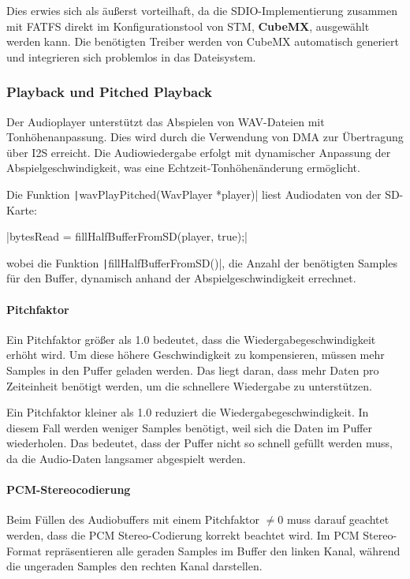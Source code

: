 Dies erwies sich als äußerst vorteilhaft, da die SDIO-Implementierung zusammen mit FATFS direkt im Konfigurationstool von STM, \textbf{CubeMX}, ausgewählt werden kann. Die benötigten Treiber werden von CubeMX automatisch generiert und integrieren sich problemlos in das Dateisystem.

\subsubsection{Playback und Pitched Playback}

Der Audioplayer unterstützt das Abspielen von WAV-Dateien mit Tonhöhenanpassung. Dies wird durch die Verwendung von DMA zur Übertragung über I2S erreicht. Die Audiowiedergabe erfolgt mit dynamischer Anpassung der Abspielgeschwindigkeit, was eine Echtzeit-Tonhöhenänderung ermöglicht.

Die Funktion \texttt|wavPlayPitched(WavPlayer *player)| liest Audiodaten von der SD-Karte:

|bytesRead = fillHalfBufferFromSD(player, true);|

wobei die Funktion \texttt|fillHalfBufferFromSD()|, die Anzahl der benötigten Samples für den Buffer, dynamisch anhand der Abspielgeschwindigkeit errechnet.

\paragraph{Pitchfaktor}

Ein Pitchfaktor größer als 1.0 bedeutet, dass die Wiedergabegeschwindigkeit erhöht wird. Um diese höhere Geschwindigkeit zu kompensieren, müssen mehr Samples in den Puffer geladen werden. Das liegt daran, dass mehr Daten pro Zeiteinheit benötigt werden, um die schnellere Wiedergabe zu unterstützen.

Ein Pitchfaktor kleiner als 1.0 reduziert die Wiedergabegeschwindigkeit. In diesem Fall werden weniger Samples benötigt, weil sich die Daten im Puffer wiederholen. Das bedeutet, dass der Puffer nicht so schnell gefüllt werden muss, da die Audio-Daten langsamer abgespielt werden.

\paragraph{PCM-Stereocodierung}

Beim Füllen des Audiobuffers mit einem Pitchfaktor \( \neq 0 \) muss darauf geachtet werden, dass die PCM Stereo-Codierung korrekt beachtet wird. 
Im PCM Stereo-Format repräsentieren alle geraden Samples im Buffer den linken Kanal, während die ungeraden Samples den rechten Kanal darstellen.

